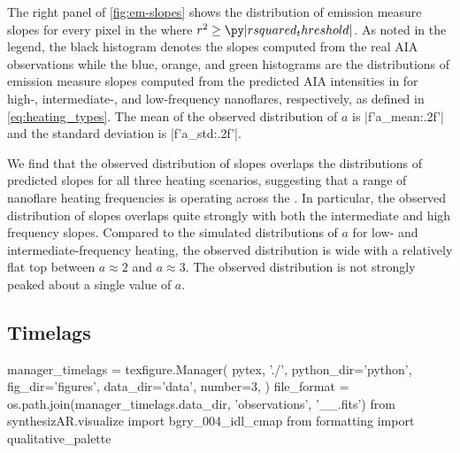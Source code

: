 The right panel of \autoref{fig:em-slopes} shows the distribution of emission measure slopes for every pixel in the \AR{} where $r^2\ge\py|rsquared_threshold|$. As noted in the legend, the black histogram denotes the slopes computed from the real AIA observations while the blue, orange, and green histograms are the distributions of emission measure slopes computed from the predicted AIA intensities in  for high-, intermediate-, and low-frequency nanoflares, respectively, as defined in \autoref{eq:heating_types}. The mean of the observed distribution of $a$ is \py[manager_em]|f'{a_mean:.2f}'| and the standard deviation is \py[manager_em]|f'{a_std:.2f}'|. 

We find that the observed distribution of slopes overlaps the distributions of predicted slopes for all three heating scenarios, suggesting that a range of nanoflare heating frequencies is operating across the \AR. In particular, the observed distribution of slopes overlaps quite strongly with both the intermediate and high frequency slopes. Compared to the simulated distributions of $a$ for low- and intermediate-frequency heating, the observed distribution is wide with a relatively flat top between $a\approx2$ and $a\approx3$. The observed distribution is not strongly peaked about a single value of $a$. 

\subsection{Timelags}\label{sec:timelags}

\begin{pycode}
manager_timelags = texfigure.Manager(
    pytex, './',
    python_dir='python',
    fig_dir='figures',
    data_dir='data',
    number=3,
)
file_format = os.path.join(manager_timelags.data_dir, 'observations', '{}_{}_{}.fits')
from synthesizAR.visualize import bgry_004_idl_cmap
from formatting import qualitative_palette
\end{pycode}


